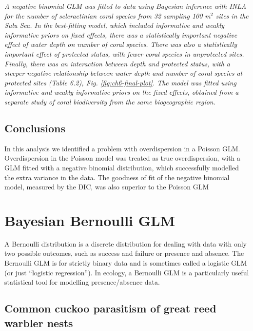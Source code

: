 \documentclass[
]{book}
\begin{document}
\emph{A negative binomial GLM was fitted to data using Bayesian inference with INLA for the number of scleractinian coral species from 32 sampling 100 m\(^2\) sites in the Sulu Sea. In the best-fitting model, which included informative and weakly informative priors on fixed effects, there was a statistically important negative effect of water depth on number of coral species. There was also a statistically important effect of protected status, with fewer coral species in unprotected sites. Finally, there was an interaction between depth and protected status, with a steeper negative relationship between water depth and number of coral species at protected sites (Table 6.2), Fig. \ref{fig:ch6-final-plot}. The model was fitted using informative and weakly informative priors on the fixed effects, obtained from a separate study of coral biodiversity from the same biogeographic region.}

\hypertarget{conclusions-3}{%
\section{Conclusions}\label{conclusions-3}}

In this analysis we identified a problem with overdispersion in a Poisson GLM. Overdispersion in the Poisson model was treated as true overdispersion, with a GLM fitted with a negative binomial distribution, which successfully modelled the extra variance in the data. The goodness of fit of the negative binomial model, measured by the DIC, was also superior to the Poisson GLM

\hypertarget{bern-glm}{%
\chapter{Bayesian Bernoulli GLM}\label{bern-glm}}

A Bernoulli distribution is a discrete distribution for dealing with data with only two possible outcomes, such as success and failure or presence and absence. The Bernoulli GLM is for strictly binary data and is sometimes called a logistic GLM (or just ``logistic regression''). In ecology, a Bernoulli GLM is a particularly useful statistical tool for modelling presence/absence data.

\hypertarget{bern-cc}{%
\section{Common cuckoo parasitism of great reed warbler nests}\label{bern-cc}}
\end{document}
